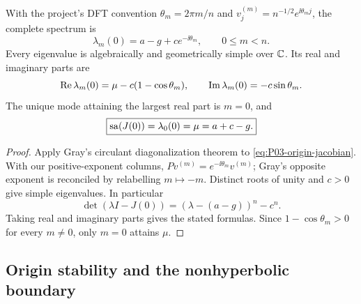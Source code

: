 \begin{proposition}
\label{prop:P03-origin-spectrum}
With the project's DFT convention $\theta_m=2\pi m/n$ and
$v^{(m)}_j=n^{-1/2}e^{\ii\theta_m j}$, the complete spectrum is
\begin{equation}
 \boxed{\lambda_m(0)=a-g+c e^{-\ii\theta_m},\qquad 0\le m<n.}
 \label{eq:P03-origin-spectrum}
\end{equation}
Every eigenvalue is algebraically and geometrically simple over $\mathbb{C}$.
Its real and imaginary parts are
\begin{equation}
 \operatorname{Re}\lambda_m(0)=\mu-c(1-\cos\theta_m),\qquad
 \operatorname{Im}\lambda_m(0)=-c\sin\theta_m.
 \label{eq:P03-origin-parts}
\end{equation}
The unique mode attaining the largest real part is $m=0$, and
\begin{equation}
 \boxed{\operatorname{sa}(J(0))=\lambda_0(0)=\mu=a+c-g.}
 \label{eq:P03-abscissa}
\end{equation}
\end{proposition}
\begin{proof}
Apply Gray's circulant diagonalization theorem
\cite[Theorem~3.1]{Gray2006} to \eqref{eq:P03-origin-jacobian}.
With our positive-exponent columns, $Pv^{(m)}=e^{-\ii\theta_m}v^{(m)}$;
Gray's opposite exponent is reconciled by relabelling $m\mapsto -m$.
Distinct roots of unity and $c>0$ give simple eigenvalues. In particular
\begin{equation}
 \det(\lambda I-J(0))=(\lambda-(a-g))^n-c^n.
 \label{eq:P03-characteristic}
\end{equation}
Taking real and imaginary parts gives the stated formulas. Since
$1-\cos\theta_m>0$ for every $m\ne0$, only $m=0$ attains $\mu$.
\end{proof}

\subsection{Origin stability and the nonhyperbolic boundary}
\label{slot:P03-2}

